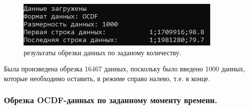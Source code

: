 {  \begin{figure}[H]
    \centering
    \includegraphics{images/forDataManipulator/ExOCDFdataAftCatQuan.png}
    \caption{результаты обрезки данных по заданому количеству.} 
    \label{fig:ExOCDFdataAftCatQuan}
  \end{figure}

  \par Была произведена обрезка 16467 данных, поскольку было введено 1000 данных, которые необходимо оставить, в режиме справо налево, т.е. в конце. 

  \par 
}

\subsubsection{ \standartTitleFont
  Обрезка OCDF-данных по заданному моменту времени. 
} \label{subsubsec:OCDFCutMom}

